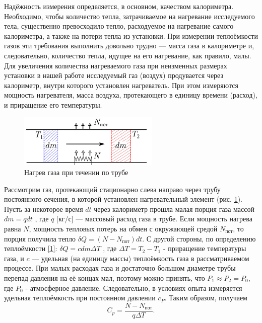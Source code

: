 \documentclass[a4paper, 12pt]{article}
\begin{document}
Надёжность измерения определяется, в основном, качеством калориметра. Необходимо, чтобы количество тепла, затрачиваемое на нагревание исследуемого тела, существенно превосходило тепло, расходуемое на нагревание самого калориметра, а также на потери тепла из установки. При измерении теплоёмкости газов эти требования выполнить довольно трудно --- масса газа в калориметре и, следовательно, количество тепла, идущее на его нагревание, как правило, малы. Для увеличения количества нагреваемого газа при неизменных размерах установки в нашей работе исследуемый газ (воздух) продувается через калориметр, внутри которого установлен нагреватель. При этом измеряются мощность нагревателя, масса воздуха, протекающего в единицу времени (расход), и приращение его температуры.

\begin{figure}
  \begin{center}
    \includegraphics[width = 0.6\textwidth]{1.png}
  \end{center}
  \caption{Нагрев газа при течении по трубе}
  \label{ris1}
\end{figure}

Рассмотрим газ, протекающий стационарно слева направо через трубу постоянного сечения, в которой установлен нагревательный элемент (рис. \ref{ris1}). Пусть за некоторое время $dt$ через калориметр прошла малая порция газа массой $dm = q dt$ , где $q$ [кг/с] --- массовый расход газа в трубе. Если мощность нагрева равна $N$, мощность тепловых потерь на обмен с окружающей средой $N_{\text{пот}}$, то порция получила тепло $\delta Q =(N - N_{\text{пот}})dt$. С другой стороны, по определению теплоёмкости
\eqref{1}: $\delta Q =c dm \Delta T$ , где $\Delta T = T_2 - T_1$ - приращение температуры газа, и $c$ --- удельная (на единицу массы) теплоёмкость газа в рассматриваемом процессе. При малых расходах газа и достаточно большом диаметре трубы перепад давления на её концах мал, поэтому можно принять, что $P_1 \approx P_2 = P_0$, где $P_0$ - атмосферное давление. Следовательно, в условиях опыта измеряется удельная теплоёмкость при постоянном давлении $c_P$. Таким образом, получаем
\begin{equation}\label{2}
C_p = \dfrac{N - N_{\text{пот}}}{q \Delta T}.
\end{equation}
\end{document}
